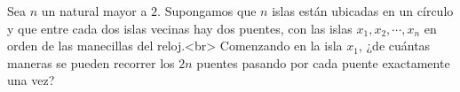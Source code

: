 Sea $n$ un natural mayor a $2$. Supongamos que $n$ islas están ubicadas en un círculo y que entre cada dos islas vecinas hay dos puentes, con las islas $x_1, x_2, \cdots , x_n$ en orden de las manecillas del reloj.<br>
Comenzando en la isla $x_1$, ¿de cuántas maneras se pueden recorrer los $2n$ puentes pasando por cada puente exactamente una vez?
